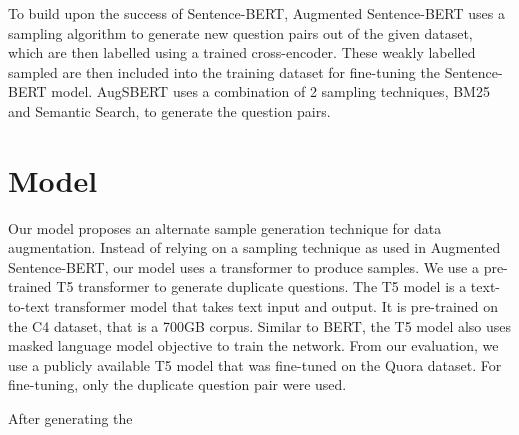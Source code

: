 \documentclass[11pt, oneside]{article}   	%
\begin{document}
\noindent To build upon the success of Sentence-BERT, Augmented Sentence-BERT uses a sampling algorithm to generate new question pairs out of the given dataset, which are then labelled using a trained cross-encoder. These weakly labelled sampled are then included into the training dataset for fine-tuning the Sentence-BERT model. AugSBERT uses a combination of 2 sampling techniques, BM25 and Semantic Search, to generate the question pairs. 


\section{Model}


Our model proposes an alternate sample generation technique for data augmentation. Instead of relying on a sampling technique as used in Augmented Sentence-BERT, our model uses a transformer to produce samples. We use a pre-trained T5 transformer to generate duplicate questions. The T5 model is a text-to-text transformer model that takes text input and output. It is pre-trained on the C4 dataset, that is a 700GB corpus. Similar to BERT, the T5 model also uses masked language model objective to train the network. From our evaluation, we use a publicly available T5 model that was fine-tuned on the Quora dataset. For fine-tuning, only the duplicate question pair were used. 

After generating the 
\end{document}

